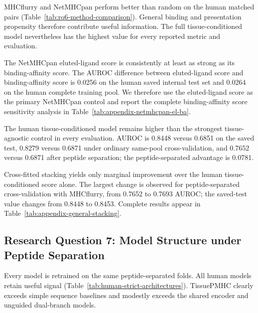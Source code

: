 MHCflurry and NetMHCpan perform better than random on the human matched pairs (Table~\ref{tab:rq6-method-comparison}). General binding and presentation propensity therefore contribute useful information. The full tissue-conditioned model nevertheless has the highest value for every reported metric and evaluation.

The NetMHCpan eluted-ligand score is consistently at least as strong as its binding-affinity score. The AUROC difference between eluted-ligand score and binding-affinity score is 0.0256 on the human saved internal test set and 0.0264 on the human complete training pool. We therefore use the eluted-ligand score as the primary NetMHCpan control and report the complete binding-affinity score sensitivity analysis in Table~\ref{tab:appendix-netmhcpan-el-ba}.

The human tissue-conditioned model remains higher than the strongest tissue-agnostic control in every evaluation. AUROC is 0.8448 versus 0.6851 on the saved test, 0.8279 versus 0.6871 under ordinary same-pool cross-validation, and 0.7652 versus 0.6871 after peptide separation; the peptide-separated advantage is 0.0781.

Cross-fitted stacking yields only marginal improvement over the human tissue-conditioned score alone. The largest change is observed for peptide-separated cross-validation with MHCflurry, from 0.7652 to 0.7693 AUROC; the saved-test value changes from 0.8448 to 0.8453. Complete results appear in Table~\ref{tab:appendix-general-stacking}.

\subsection{Research Question 7: Model Structure under Peptide Separation}

Every model is retrained on the same peptide-separated folds. All human models retain useful signal (Table~\ref{tab:human-strict-architectures}). TissuePMHC clearly exceeds simple sequence baselines and modestly exceeds the shared encoder and unguided dual-branch models.

